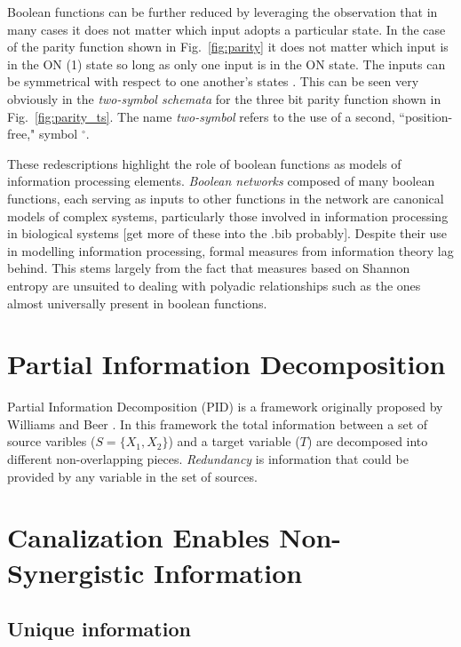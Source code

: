 \documentclass[12pt]{article} %
\newcommand{\figref}[1]{Fig.~\ref{fig:#1}}
\begin{document}
Boolean functions can be further reduced by leveraging the observation that in
many cases it does not matter which input adopts a particular state. In the case
of the parity function shown in \figref{parity} it does not matter which input 
is in the ON (1) state so long as only one input is in the ON state. The inputs 
can be symmetrical with respect to one another's states 
\cite{marques-pita_canalization_2013}. This can be seen very 
obviously in the \textit{two-symbol schemata} for the three bit parity function
shown in \figref{parity_ts}. The name \textit{two-symbol} refers to the use
of a second, ``position-free," symbol $^\circ$.

These redescriptions highlight the role of boolean functions as models of 
information processing elements. \textit{Boolean networks} composed of many
boolean functions, each serving as inputs to other functions in the network are
canonical models of complex systems, particularly those involved in information
processing in biological systems \cite{kauffman_emergent_1984,willadsen_robustness_2007,marques-pita_canalization_2013} 
[get more of these into the .bib probably]. Despite their use in modelling
information processing, formal measures from information theory lag behind. This
stems largely from the fact that measures based on Shannon entropy are unsuited
to dealing with polyadic relationships 
\cite{james_information_2016,james_multivariate_2017} such as the ones almost
universally present in boolean functions. 

\section{Partial Information Decomposition}\label{sec:partial}

Partial Information Decomposition (PID) is a framework originally proposed by
Williams and Beer \cite{williams_nonnegative_2010}. In this framework the
total information between a set of source varibles ($S = \{X_1, X_2\}$) and a 
target variable ($T$) are decomposed into different non-overlapping pieces. 
\textit{Redundancy} is information that could be provided by any variable in 
the set of sources.

\section{Canalization Enables Non-Synergistic Information}\label{sec:enables}

\subsection{Unique information}
\end{document}
